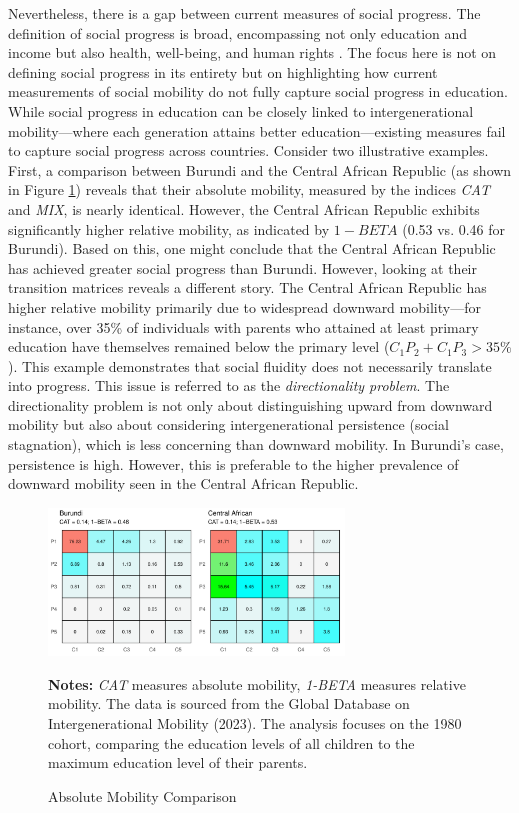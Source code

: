 Nevertheless, there is a gap between current measures of social progress. The definition of social progress is broad, encompassing not only education and income but also health, well-being, and human rights \citep{narayan2018fair, blanden2013cross, deutscher2023measuring}. The focus here is not on defining social progress in its entirety but on highlighting how current measurements of social mobility do not fully capture social progress in education. While social progress in education can be closely linked to intergenerational mobility---where each generation attains better education---existing measures fail to capture social progress across countries. Consider two illustrative examples. First, a comparison between Burundi and the Central African Republic (as shown in Figure \ref{fig:compare1}) reveals that their absolute mobility, measured by the indices \textit{CAT} and \textit{MIX}, is nearly identical. However, the Central African Republic exhibits significantly higher relative mobility, as indicated by $1 - BETA$ (0.53 vs. 0.46 for Burundi). Based on this, one might conclude that the Central African Republic has achieved greater social progress than Burundi. However, looking at their transition matrices reveals a different story. The Central African Republic has higher relative mobility primarily due to widespread downward mobility---for instance, over 35\% of individuals with parents who attained at least primary education have themselves remained below the primary level ($C_1P_2 + C_1P_3 > 35\%$). This example demonstrates that social fluidity does not necessarily translate into progress. This issue is referred to as the \textit{directionality problem}. The directionality problem is not only about distinguishing upward from downward mobility but also about considering intergenerational persistence (social stagnation), which is less concerning than downward mobility. In Burundi's case, persistence is high. However, this is preferable to the higher prevalence of downward mobility seen in the Central African Republic.

\begin{figure}[h!]
    \centering
    \includegraphics[width=0.7\textwidth]{figs/compare1.pdf}
    \caption{Absolute Mobility Comparison}
    \label{fig:compare1}
    \begin{minipage}{1\linewidth}
	\vspace{0.2cm}
	\footnotesize
	\textbf{Notes:} \textit{CAT} measures absolute mobility, \textit{1-BETA} measures relative mobility. The data is sourced from the Global Database on Intergenerational Mobility (2023). The analysis focuses on the 1980 cohort, comparing the education levels of all children to the maximum education level of their parents.		
	\end{minipage}
\end{figure}

